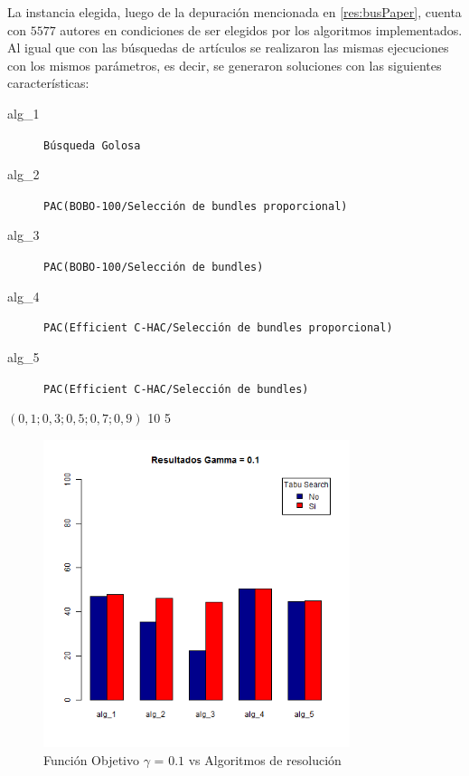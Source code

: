 La instancia elegida, luego de la depuración mencionada en \ref{res:busPaper}, cuenta con $5577$ autores en condiciones de ser elegidos por los algoritmos implementados.\\
Al igual que con las búsquedas de artículos se realizaron las mismas ejecuciones con los mismos parámetros, es decir, se generaron soluciones con las siguientes características:\\
\Solucion
{}
{
\begin{description}
	\item[alg\_1] \texttt{Búsqueda Golosa}
	\item[alg\_2] \texttt{PAC(BOBO-100/Selección de bundles proporcional)}
	\item[alg\_3] \texttt{PAC(BOBO-100/Selección de bundles)}
	\item[alg\_4] \texttt{PAC(Efficient C-HAC/Selección de bundles proporcional)}
	\item[alg\_5] \texttt{PAC(Efficient C-HAC/Selección de bundles)}
\end{description}
}
{$(0,1; 0,3; 0,5; 0,7; 0,9)$}
{10}
{5}

\begin{figure}[H]
  \centering
    \includegraphics[width=0.8\textwidth]{resultados/authors/Graficos_agrupados/gamma01-autores.png}
  \caption{Función Objetivo $\gamma$ = $0.1$ vs Algoritmos de resolución}
  \label{res:img-autores-agr-gamma01}
\end{figure}

